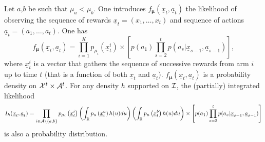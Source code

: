 \documentclass{colt2016} %
\begin{document}
Let $a$,$b$ be such that $\mu_a < \mu_b$. One introduces $f_{\bm \mu}(\underline{x}_t,\underline{a}_t)$ the likelihood of observing the sequence of rewards $\underline{x}_t = (x_1,\dots,x_t)$ and sequence of actions $\underline{a}_t=(a_1,\dots,a_t)$. One has 
\[f_{\bm \mu}(\underline{x}_t,\underline{a}_t) = \prod_{i=1}^{K}p_{\mu_i}\left(\underline{x}_t^i\right)\times \left[p(a_1) \prod_{s=2}^t p(a_s | \underline{x}_{s-1},\underline{a}_{s-1})\right],\]
where $\underline{x}_t^i$ is a vector that gathers the sequence of successive rewards from arm $i$ up to time $t$ (that is a function of both $\underline{x}_t$ and $\underline{a}_t$). $f_{\bm \mu}(\underline{x}_t,\underline{a}_t)$ is a probability density on $\mathcal{X}^t\times \mathcal{A}^t$. For any density $h$ supported on $\mathcal{I}$, the (partially) integrated likelihood
\[I_h(\underline{x}_t,\underline{a}_t) = \prod_{i\in\mathcal{A} \setminus \{a,b\}}p_{\mu_i}\left(\underline{x}_t^i\right) \left(\int_{\mathbb{R}} p_{u}\left(\underline{x}_t^a\right)h(u)du\right)\left(\int_{\mathbb{R}} p_{u}\left(\underline{x}_t^b\right)h(u)du\right)\times \left[p(a_1) \prod_{s=2}^t p(a_s | \underline{x}_{s-1},\underline{a}_{s-1})\right]\]
is also a probability distribution.
\end{document}
